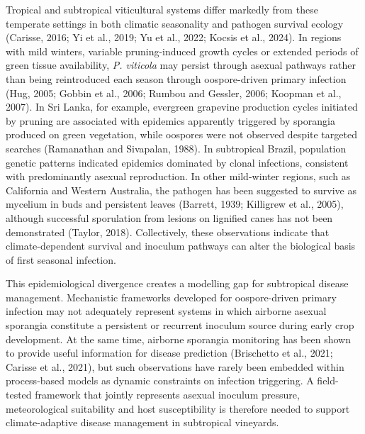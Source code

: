 \documentclass[
]{article}
\begin{document}
Tropical and subtropical viticultural systems differ markedly from these
temperate settings in both climatic seasonality and pathogen survival
ecology (Carisse, 2016; Yi et al., 2019; Yu et al., 2022; Kocsis et
al., 2024). In regions with mild winters, variable pruning-induced
growth cycles or extended periods of green tissue availability,
\emph{P. viticola} may persist through asexual pathways rather than
being reintroduced each season through oospore-driven primary infection
(Hug, 2005; Gobbin et al., 2006; Rumbou and Gessler, 2006; Koopman et
al., 2007). In Sri Lanka, for example, evergreen grapevine production
cycles initiated by pruning are associated with epidemics apparently
triggered by sporangia produced on green vegetation, while oospores were
not observed despite targeted searches (Ramanathan and Sivapalan, 1988).
In subtropical Brazil, population genetic patterns indicated epidemics
dominated by clonal infections, consistent with predominantly asexual
reproduction. In other mild-winter regions, such as California and
Western Australia, the pathogen has been suggested to survive as
mycelium in buds and persistent leaves (Barrett, 1939; Killigrew et
al., 2005), although successful sporulation from lesions on lignified
canes has not been demonstrated (Taylor, 2018). Collectively, these
observations indicate that climate-dependent survival and inoculum
pathways can alter the biological basis of first seasonal infection.

This epidemiological divergence creates a modelling gap for subtropical
disease management. Mechanistic frameworks developed for oospore-driven
primary infection may not adequately represent systems in which
airborne asexual sporangia constitute a persistent or recurrent inoculum
source during early crop development. At the same time, airborne
sporangia monitoring has been shown to provide useful information for
disease prediction (Brischetto et al., 2021; Carisse et al., 2021), but
such observations have rarely been embedded within process-based models
as dynamic constraints on infection triggering. A field-tested framework
that jointly represents asexual inoculum pressure, meteorological
suitability and host susceptibility is therefore needed to support
climate-adaptive disease management in subtropical vineyards.
\end{document}
